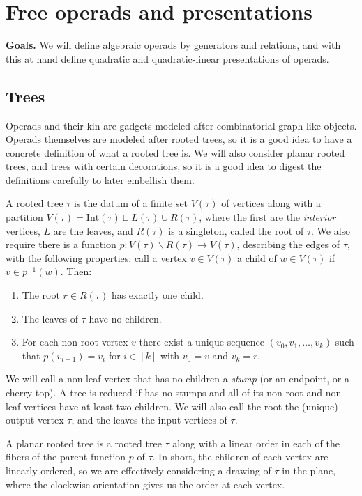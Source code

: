 \documentclass[fleqn, a4paper, twoside]{article}
\newcommand{\0}{\langle 0\rangle}
\newenvironment{tenumerate}{
 \begin{enumerate}
  \setlength{\itemsep}{0pt}
  \setlength{\parskip}{0pt}
}{\end{enumerate}}
\DeclareRobustCommand{\[}{\begin{equation}}%
\DeclareRobustCommand{\]}{\end{equation}}%
\theoremstyle{mytheorem}
\theoremstyle{introthm}
\theoremstyle{mydefinition}
\theoremstyle{mydefinition2}
\theoremstyle{plain} %
\newcommand{\?}{\,?\,}
\theoremstyle{mytheorem}
\theoremstyle{plain} %
\newcommand\blankpage{%
    \null
    \thispagestyle{empty}%
    \newpage}
\begin{document}
\afterpage{\blankpage}
\newpage
\section{Free operads and presentations}\label{lecture:freeops}

\textbf{Goals.} We will define algebraic operads
by generators and relations, and with this at
hand define quadratic and quadratic-linear
presentations of operads. 

\subsection{Trees}

Operads and their kin are gadgets modeled after
combinatorial graph-like objects. Operads themselves are modeled after
rooted trees, so it is a good idea to have a concrete definition of 
what a rooted tree is. We will also consider planar rooted trees,
and trees with certain decorations, so it is a good idea to digest
the definitions carefully to later embellish them.

A rooted tree $\tau$ is the datum of a finite set $V(\tau)$
of vertices along with a partition $V(\tau) = 
\mathrm{Int}(\tau)\sqcup L(\tau) \cup R(\tau)$,
where the first are the \emph{interior} vertices, $L$ are the leaves, and $R(\tau)$ is
a singleton, called the root of $\tau$. We also require there is 
a function $p :V(\tau)\smallsetminus R(\tau) \longrightarrow V(\tau)$,
describing the edges of $\tau$, 
with the following properties: call a vertex $v\in V(\tau)$ a child 
of $w\in V(\tau)$ if $v\in p^{-1}(w)$. Then:
\begin{tenumerate}
\item The root $r\in R(\tau)$ has exactly one child.
\item The leaves of $\tau$ have no children.
\item For each non-root vertex $v$ there exist a unique sequence
$(v_0,v_1,\ldots,v_k)$ such that $p(v_{i-1}) = v_{i}$ for $i\in [k]$
with $v_0 = v$ and $v_k = r$.
\end{tenumerate}
We will call a non-leaf vertex that has no children a \emph{stump}
(or an endpoint, or a cherry-top).
A tree is reduced if has no stumps and all of its non-root and
non-leaf vertices have at least two children. We will also call
the root the (unique) output vertex $\tau$, and the leaves
the input vertices of $\tau$. 

A planar rooted tree is a rooted tree $\tau$
along with a linear order in each of the fibers
of the parent function $p$ of $\tau$. In short,
the children of each vertex are linearly ordered,
so we are effectively considering a drawing of
$\tau$ in the plane, where the clockwise
orientation gives us the order at each
vertex. 
\end{document}
